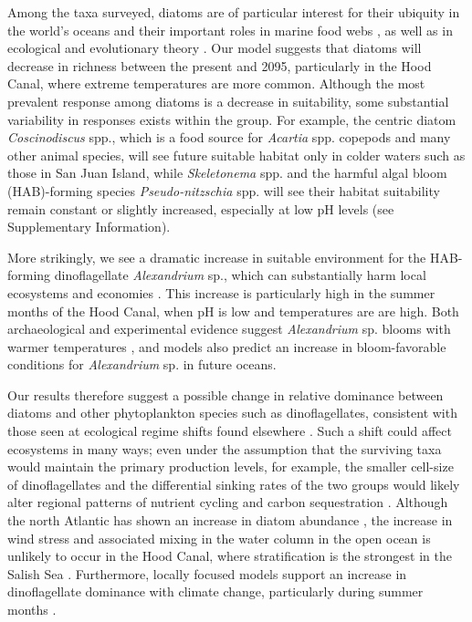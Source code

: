 \documentclass[11pt]{article}
\begin{document}
\begin{linenumbers}
Among the taxa surveyed, diatoms are of particular interest for their ubiquity in the world's oceans and their important roles in marine food webs \cite{armbrust2009life, wasmund2017diatom}, as well as in ecological and evolutionary theory \cite{margalef11978}. Our model suggests that diatoms will decrease in richness between the present and 2095, particularly in the Hood Canal, where extreme temperatures are more common. Although the most prevalent response among diatoms is a decrease in suitability, some substantial variability in responses exists within the group. For example, the centric diatom \textit{Coscinodiscus} spp., which is a food source for \textit{Acartia} spp. copepods \cite{jansen2008copepods} and many other animal species, will see future suitable habitat only in colder waters such as those in San Juan Island, while \textit{Skeletonema} spp. and the harmful algal bloom (HAB)-forming species \textit{Pseudo-nitzschia} spp. will see their habitat suitability remain constant or slightly increased, especially at low pH levels (see Supplementary Information).

More strikingly, we see a dramatic increase in suitable environment for the HAB-forming dinoflagellate \textit{Alexandrium} sp., which can substantially harm local ecosystems \cite{colin2002latitudinal} and economies \cite{anderson2000estimated}. This increase is particularly high in the summer months of the Hood Canal, when pH is low and temperatures are are high. Both archaeological and experimental evidence suggest \textit{Alexandrium} sp. blooms with warmer temperatures \cite{mudie2002palynological}, and models \cite{moore2015present} also predict an increase in bloom-favorable conditions for \textit{Alexandrium} sp. in future oceans. 

 Our results therefore suggest a possible change in relative dominance between diatoms and other phytoplankton species such as dinoflagellates, consistent with those seen at ecological regime shifts found elsewhere \cite{wasmund2017diatom, hinder2012changes}. Such a shift could affect ecosystems in many ways; even under the assumption that the surviving taxa would maintain the primary production levels, for example, the smaller cell-size of dinoflagellates and the differential sinking rates of the two groups would likely alter regional patterns of nutrient cycling and carbon sequestration \cite{xiao2018warming, anderson2002harmful, bienfang1984sinking, polimene2017biological}. Although the north Atlantic has shown an increase in diatom abundance \cite{hinder2012changes}, the increase in wind stress and associated mixing in the water column in the open ocean is unlikely to occur in the Hood Canal, where stratification is the strongest in the Salish Sea \cite{moore2008descriptive}. Furthermore, locally focused models support an increase in dinoflagellate dominance with climate change, particularly during summer months \cite{khangaonkar2019salish}.
 

\end{linenumbers}
\end{document}
